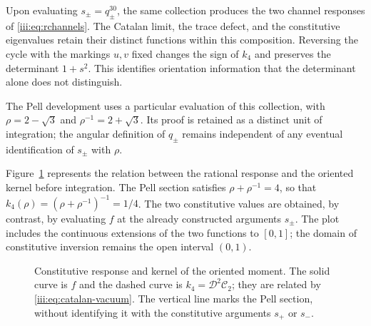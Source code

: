 Upon evaluating $s_\pm=q_\pm^{30}$, the same collection produces the two channel
responses of \eqref{iii:eq:rchannels}. The Catalan limit, the trace
defect, and the constitutive eigenvalues retain their distinct functions
within this composition. Reversing the cycle with the markings $u,v$
fixed changes the sign of $k_4$ and preserves the determinant $1+s^2$.
This identifies orientation information that the determinant
alone does not distinguish.

The Pell development uses a particular evaluation of this collection,
with $\rho=2-\sqrt3$ and $\rho^{-1}=2+\sqrt3$. Its proof is retained as
a distinct unit of integration; the angular definition of $q_\pm$ remains
independent of any eventual identification of $s_\pm$ with $\rho$.

Figure~\ref{iii:fig:respuesta-momento-pell} represents the relation between
the rational response and the oriented kernel before integration. The Pell
section satisfies $\rho+\rho^{-1}=4$, so that
$k_4(\rho)=(\rho+\rho^{-1})^{-1}=1/4$. The two constitutive values
are obtained, by contrast, by evaluating $f$ at the already constructed
arguments $s_\pm$. The plot includes the continuous extensions of the two
functions to $[0,1]$; the domain of constitutive inversion remains
the open interval $(0,1)$.

\begin{figure}[htbp]
\centering
{}
\caption{Constitutive response and kernel of the oriented moment. The solid
curve is $f$ and the dashed curve is
$k_4=\mathcal D^2\mathcal C_2$; they are related by
\eqref{iii:eq:catalan-vacuum}. The vertical line marks the Pell section,
without identifying it with the constitutive arguments $s_+$ or $s_-$.}
\label{iii:fig:respuesta-momento-pell}
\end{figure}

